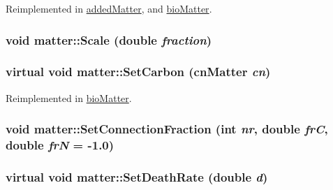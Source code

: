 Reimplemented in \hyperlink{classadded_matter_a17298527be7046b6035a163e1f558f84}{addedMatter}, and \hyperlink{classbio_matter_aa432cb13da2d6c6a800e45bfcad5654b}{bioMatter}.\hypertarget{classmatter_a63dd0c869dd3a37857fd9bbaf714cb99}{
\subsubsection[{Scale}]{\setlength{\rightskip}{0pt plus 5cm}void matter::Scale (double {\em fraction})}}
\label{classmatter_a63dd0c869dd3a37857fd9bbaf714cb99}
\hypertarget{classmatter_a6ede9887bd438658b4833d1242d8e2a7}{
\subsubsection[{SetCarbon}]{\setlength{\rightskip}{0pt plus 5cm}virtual void matter::SetCarbon ({\bf cnMatter} {\em cn})}}
\label{classmatter_a6ede9887bd438658b4833d1242d8e2a7}


Reimplemented in \hyperlink{classbio_matter_ab5e10fda0c8137df57be8baade98d27c}{bioMatter}.\hypertarget{classmatter_a3ef43a1976efeced60e639fb1ec6579a}{
\subsubsection[{SetConnectionFraction}]{\setlength{\rightskip}{0pt plus 5cm}void matter::SetConnectionFraction (int {\em nr}, \/  double {\em frC}, \/  double {\em frN} = {\ttfamily -\/1.0})}}
\label{classmatter_a3ef43a1976efeced60e639fb1ec6579a}
\hypertarget{classmatter_a2969cf8d4330d010ce8b2d7c9f989364}{
\subsubsection[{SetDeathRate}]{\setlength{\rightskip}{0pt plus 5cm}virtual void matter::SetDeathRate (double {\em d})}}
\label{classmatter_a2969cf8d4330d010ce8b2d7c9f989364}


